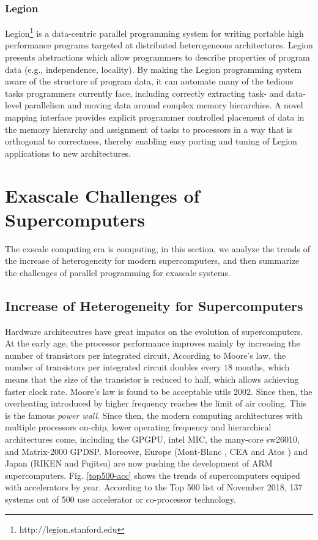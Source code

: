 \subsubsection{Legion}

Legion\footnote{http://legion.stanford.edu} \cite{grimshaw1994synopsis} is a data-centric parallel programming system for writing portable high performance programs targeted at distributed heterogeneous architectures. Legion presents abstractions which allow programmers to describe properties of program data (e.g., independence, locality). By making the Legion programming system aware of the structure of program data, it can automate many of the tedious tasks programmers currently face, including correctly extracting task- and data-level parallelism and moving data around complex memory hierarchies. A novel mapping interface provides explicit programmer controlled placement of data in the memory hierarchy and assignment of tasks to processors in a way that is orthogonal to correctness, thereby enabling easy porting and tuning of Legion applications to new architectures.


\section{Exascale Challenges of Supercomputers}\label{Exascale Challenges of Supercomputers}

The exscale computing era is computing, in this section, we analyze the trends of the increase of heterogeneity for modern supercomputers, and then summarize the challenges of parallel programming for exascale systems.

\subsection{Increase of Heterogeneity for Supercomputers} \label{Trends of Heterogeneity}

Hardware architecutres have great impatcs on the evolution of supercomputers. At the early age, the processor performance improves mainly by increasing the number of transistors per integrated circuit, According to Moore's law, the number of transistors per integrated circuit doubles every $18$ months, which means that the size of the transistor is reduced to half, which allows achieving faster clock rate. Moore's law is found to be acceptable utils 2002. Since then, the overheating introduced by higher frequency reaches the limit of air cooling. This is the famous \textit{power wall}. Since then, the modern computing architectures with multiple processors on-chip, lower operating frequency and hierarchical architectures come, including the GPGPU, intel MIC, the many-core sw26010, and Matrix-2000 GPDSP. Moreover, Europe (Mont-Blanc \cite{rajovic2016mont}, CEA and Atos \cite{ceaarm}) and Japan (RIKEN and Fujitsu) \cite{japanarm} are now pushing the development of ARM supercomputers. Fig. \ref{top500-acc} shows the trends of supercomputers equiped with accelerators by year. According to the Top 500 list of November 2018, 137 systems out of 500 use accelerator or co-processor technology.

